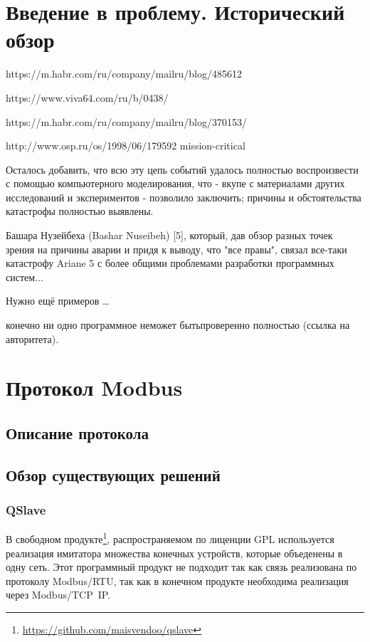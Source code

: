 \chapter{Введение в проблему. Исторический обзор}


https://m.habr.com/ru/company/mailru/blog/485612

https://www.viva64.com/ru/b/0438/

https://m.habr.com/ru/company/mailru/blog/370153/

http://www.osp.ru/os/1998/06/179592
mission-critical


Осталось добавить, что всю эту цепь событий удалось полностью воспроизвести с помощью компьютерного моделирования, что - вкупе с материалами других исследований и экспериментов - позволило заключить; причины и обстоятельства катастрофы полностью выявлены.

Башара Нузейбеха (Bashar Nuseibeh) [5], который, дав обзор разных точек зрения на причины аварии и придя к выводу, что "все правы", связал все-таки катастрофу Ariane 5 с более общими проблемами разработки программных систем...

Нужно ещё примеров \ldots

конечно ни одно программное неможет бытьпроверенно полностью (ссылка на авторитета).

\chapter{Протокол Modbus}\label{ch:ch1}

\section{Описание протокола}

\section{Обзор существующих решений}\label{sec:ch1/sec1}
\subsection{QSlave}

В свободном продукте\footnote{\url{https://github.com/maisvendoo/qslave}}, распространяемом по лиценции GPL используется
реализация имитатора множества конечных устройств, которые объеденены в одну сеть.
Этот программный продукт не подходит так как связь реализована по протоколу
Modbus/RTU, так как в конечном продукте необходима реализация через Modbus/TCP~IP.

